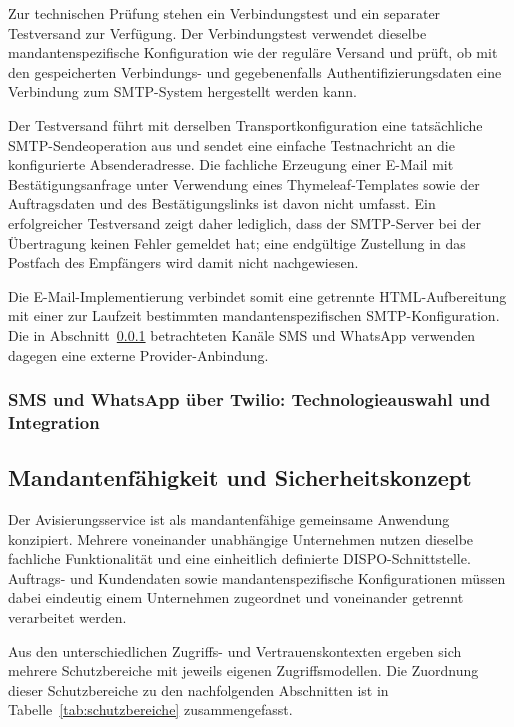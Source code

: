 \documentclass[
  12pt,
  a4paper,
  oneside
]{article}
\newcommand{\contentplaceholder}{%
  \par\noindent\rule{0pt}{\baselineskip}\par
}
\begin{document}
Zur technischen Prüfung stehen ein Verbindungstest und ein separater
Testversand zur Verfügung. Der Verbindungstest verwendet dieselbe
mandantenspezifische Konfiguration wie der reguläre Versand und prüft, ob mit
den gespeicherten Verbindungs- und gegebenenfalls Authentifizierungsdaten eine
Verbindung zum SMTP-System hergestellt werden kann.

Der Testversand führt mit derselben Transportkonfiguration eine tatsächliche
SMTP-Sendeoperation aus und sendet eine einfache Testnachricht an die
konfigurierte Absenderadresse. Die fachliche Erzeugung einer E-Mail mit Bestätigungsanfrage unter Verwendung
eines Thymeleaf-Templates sowie der Auftragsdaten und des Bestätigungslinks
ist davon nicht umfasst. Ein erfolgreicher Testversand zeigt
daher lediglich, dass der SMTP-Server bei der Übertragung keinen Fehler
gemeldet hat; eine endgültige Zustellung in das Postfach des Empfängers wird
damit nicht nachgewiesen.

Die E-Mail-Implementierung verbindet somit eine getrennte HTML-Aufbereitung mit
einer zur Laufzeit bestimmten mandantenspezifischen SMTP-Konfiguration. Die in
Abschnitt~\ref{sec:sms-whatsapp} betrachteten Kanäle SMS und WhatsApp verwenden
dagegen eine externe Provider-Anbindung.

\subsubsection{SMS und WhatsApp über Twilio: Technologieauswahl und Integration}
\label{sec:sms-whatsapp}
\contentplaceholder

\subsection{Mandantenfähigkeit und Sicherheitskonzept}
\label{sec:sicherheitskonzept}

Der Avisierungsservice ist als mandantenfähige gemeinsame Anwendung konzipiert.
Mehrere voneinander unabhängige Unternehmen nutzen dieselbe fachliche
Funktionalität und eine einheitlich definierte DISPO-Schnittstelle. Auftrags-
und Kundendaten sowie mandantenspezifische Konfigurationen müssen dabei
eindeutig einem Unternehmen zugeordnet und voneinander getrennt verarbeitet
werden.

Aus den unterschiedlichen Zugriffs- und Vertrauenskontexten ergeben sich mehrere
Schutzbereiche mit jeweils eigenen Zugriffsmodellen. Die Zuordnung dieser
Schutzbereiche zu den nachfolgenden Abschnitten ist in
Tabelle~\ref{tab:schutzbereiche} zusammengefasst.
\end{document}
